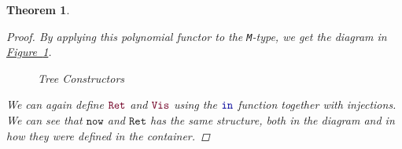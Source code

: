 \documentclass[twoside,11pt,openright]{report}
\theoremstyle{plain} %
\newtheorem{thm}{Theorem}[section]
\theoremstyle{definition}
\theoremstyle{remark}
\newcommand*{\figref}[1]{\hyperref[fig:#1]{Figure~\ref*{fig:#1}}}
\newcommand*{\type}[1]{\textcolor{magenta!90!black}{#1}}
\newcommand*{\universe}[1]{\textcolor{orange!80!black}{#1}}
\newcommand*{\function}[1]{\textcolor{blue!60!black}{\ensuremath{\mathtt{#1}}}}
\newcommand*{\constructor}[1]{\textcolor{purple!60!black}{\ensuremath{\mathtt{#1}}}}
\newcommand*{\typeformer}[1]{\ensuremath{\mathtt{#1}}}
\begin{document}
\begin{thm}
\begin{proof}
By applying this polynomial functor to the \texttt{M}-type, we get the diagram in \figref{tree-constructors}. 
\begin{figure}[h]
  \centering
  \caption{Tree Constructors}
  \label{fig:tree-constructors}
\end{figure}
We can again define \(\constructor{Ret}\) and \(\constructor{Vis}\) using the \(\function{in}\) function together with injections. We can see that \constructor{now} and \constructor{Ret} has the same structure, both in the diagram and in how they were defined in the container.
\end{proof}
\end{thm}
\end{document}

